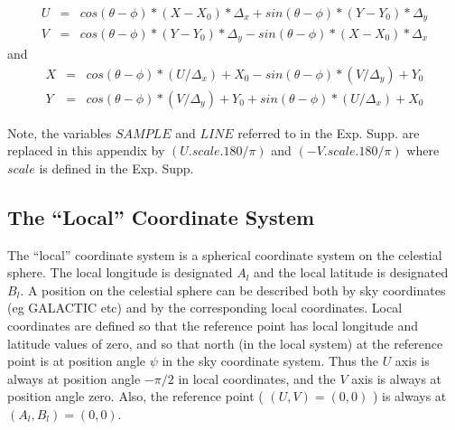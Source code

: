 \begin{eqnarray*}
U & = & cos( \theta - \phi )*(X - X_{0})*\Delta_{x} +
        sin( \theta - \phi )*(Y - Y_{0})*\Delta_{y}\\
V & = & cos( \theta - \phi )*(Y - Y_{0})*\Delta_{y} -
        sin( \theta - \phi )*(X - X_{0})*\Delta_{x}
\end{eqnarray*}
and
\begin{eqnarray*}
X & = & cos( \theta - \phi )*(U/\Delta_{x}) + X_{0} -
        sin( \theta - \phi )*(V/\Delta_{y}) + Y_{0}\\
Y & = & cos( \theta - \phi )*(V/\Delta_{y}) + Y_{0} +
        sin( \theta - \phi )*(U/\Delta_{x}) + X_{0}
\end{eqnarray*}

Note, the variables $SAMPLE$ and $LINE$ referred to in the Exp. Supp.
are replaced in this appendix by $(U.scale.180/\pi)$ and $(-V.scale.180/\pi)$
where $scale$ is defined in the Exp. Supp.

\subsection {The ``Local'' Coordinate System}
The ``local'' coordinate system is a spherical coordinate system on the
celestial sphere. The local longitude is designated $A_{l}$ and the local
latitude is designated $B_{l}$. A position on the celestial sphere can be
described both by sky coordinates (eg GALACTIC etc) and by the corresponding
local coordinates. Local coordinates are defined so that the reference point has
local longitude and latitude values of zero, and so that north (in the local
system) at the reference point is at position angle $\psi$ in the sky coordinate
system. Thus the $U$ axis is always at position angle $-\pi/2$ in local
coordinates, and the $V$ axis is always at position angle zero. Also, the
reference point ( $(U,V)=(0,0)$  ) is always at $(A_{l},B_{l})=(0,0)$.

